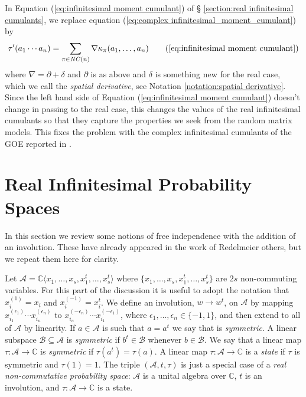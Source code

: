 \documentclass[11pt]{amsart}
\theoremstyle{definition}
\numberwithin{theorem}{section}
\newcommand{\bC}{\mathbb{C}}
\newcommand{\cA}{\mathcal{A}}
\newcommand{\cB}{\mathcal{B}}
\newcommand{\st}[1]{{\scriptscriptstyle#1}}
\newcommand{\NC}{\mathit{NC}}
\begin{document}
In Equation (\ref{eq:infinitesimal moment cumulant}) of \S
\ref{section:real infinitesimal cumulants}, we replace
equation (\ref{eq:complex infinitesimal_moment_cumulant}) by
\begin{equation}
\tau'(a_1 \cdots a_n) = \sum_{\pi \in \NC(n)}
\nabla\kappa_\pi (a_1, \dots, a_n)
\tag{\ref{eq:infinitesimal moment cumulant}}
\end{equation}
where $\nabla = \partial + \delta$ and $\partial$ is as
above and $\delta$ is something new for the real case, which
we call the \textit{spatial derivative}, see Notation
\ref{notation:spatial derivative}. Since the left hand side
of Equation (\ref{eq:infinitesimal moment cumulant}) doesn't
change in passing to the real case, this changes the values
of the real infinitesimal cumulants so that they capture the
properties we seek from the random matrix models. This fixes
the problem with the complex infinitesimal cumulants of the
GOE reported in \cite[Prop. 29]{m}.


\section{Real Infinitesimal Probability Spaces}\label{sec:real infinitesimal probability spaces}

In this section we review some notions of free independence
with the addition of an involution. These have already
appeared in the work of Redelmeier \cite{r} others, but we
repeat them here for clarity.

Let $\cA = \bC\langle x_1, \dots, x_s, x_1^t, \dots,
x_s^t\rangle$ where $\{ x_1, \dots, x_s, x_1^t, \dots, x_s^t
\}$ are $2 s$ non-commuting variables. For this part of the
discussion it is useful to adopt the notation that
$x^{\st{(1)}}_i = x_i$ and $x^{\st{(-1)}}_i = x_i^t$. We
define an involution, $w \to w^t$, on $\cA$ by mapping
$x^{(\epsilon_1)}_{i_1} \cdots x^{(\epsilon_n)}_{i_n}$ to
$x^{(-\epsilon_n)}_{i_n} \cdots x^{(-\epsilon_1)}_{i_1}$,
where $\epsilon_1, \dots, \epsilon_n \in \{-1, 1\}$, and
then extend to all of $\cA$ by linearity. If $a \in \cA$ is
such that $a = a^t$ we say that is \textit{symmetric}. A
linear subspace $\cB \subseteq \cA$ is \textit{symmetric} if
$b^t \in \cB$ whenever $b \in \cB$.  We say that a linear
map $\tau: \cA \to \bC$ is \textit{symmetric} if $\tau(a^t)
= \tau(a)$. A linear map $\tau: \cA \to \bC$ is a
\textit{state} if $\tau$ is symmetric and $\tau(1) = 1$. The
triple $(\cA, t, \tau)$ is just a special case of a
\textit{real non-commutative probability space}: $\cA$ is a
unital algebra over $\bC$, $t$ is an involution, and $\tau:
\cA \to \bC$ is a state.
\end{document}
